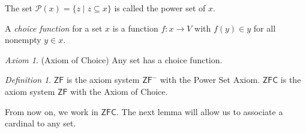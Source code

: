 \documentclass[a4paper, 11pt]{amsart}
\theoremstyle{remark}
\newtheorem{definition}[definition]{Definition}
\newtheorem*{axiom}{Axiom}
\newcommand{\axiomft}[1]{\mathsf{#1}}
\newcommand{\ZFC}{\axiomft{ZFC}}
\newcommand{\ZF}{\axiomft{ZF}}
\newcommand{\pow}{\mathcal{P}}
\begin{document}
The set $\pow(x)=\{z\mid z\subseteq x \}$ is called the power set of $x$. 

A \emph{choice function} for a set $x$ is a function $f\colon x\rightarrow V$ with $f(y)\in y$ for all nonempty $y\in x$. 

\begin{axiom}(Axiom of Choice) 
Any set has a choice function. 
\end{axiom} 


\begin{definition} 
$\ZF$ is the axiom system $\ZF^-$ with the Power Set Axiom. 
$\ZFC$ is the axiom system $\ZF$ with the Axiom of Choice. 
\end{definition} 

From now on, we work in $\ZFC$. 
The next lemma will allow us to associate a cardinal to any set. 
\end{document}
